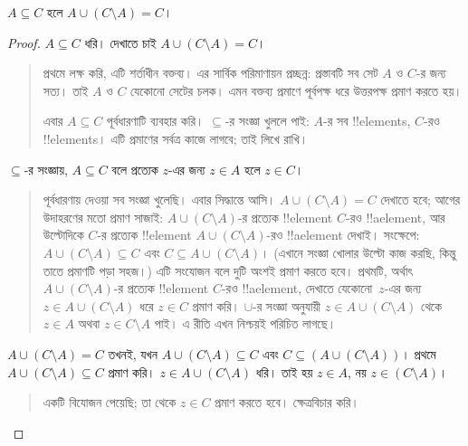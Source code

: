 \documentclass[../../../include/open-logic-section]{subfiles}
\begin{document}


\begin{prop}
$A \subseteq C$ হলে $A \cup (C \setminus A) = C$।
\end{prop}

\begin{proof}
  $A \subseteq C$ ধরি। দেখাতে চাই
  $A \cup (C \setminus A) = C$।
  \begin{quote}
    প্রথমে লক্ষ করি, এটি শর্তাধীন বক্তব্য। এর
    সার্বিক পরিমাণায়ন প্রচ্ছন্ন: প্রস্তাবটি সব সেট
    $A$ ও $C$-র জন্য সত্য। তাই $A$ ও $C$
    যেকোনো সেটের চলক। এমন বক্তব্য প্রমাণে
    পূর্বপক্ষ ধরে উত্তরপক্ষ প্রমাণ করতে হয়।

    এবার $A \subseteq C$ পূর্বধারণাটি ব্যবহার করি।
    $\subseteq$-র সংজ্ঞা খুললে পাই: $A$-র সব
    !!{element}s, $C$-রও !!{element}s।
    এটি প্রমাণের সর্বত্র কাজে লাগবে; তাই লিখে রাখি।
  \end{quote}
  $\subseteq$-র সংজ্ঞায়, $A \subseteq C$ বলে
  প্রত্যেক $z$-এর জন্য $z \in A$ হলে $z \in C$।
  \begin{quote}
    পূর্বধারণায় দেওয়া সব সংজ্ঞা খুলেছি। এবার
    সিদ্ধান্তে আসি। $A \cup (C \setminus A) = C$
    দেখাতে হবে; আগের উদাহরণের মতো প্রমাণ
    সাজাই: $A \cup (C \setminus A)$-র প্রত্যেক
    !!{element} $C$-রও !!a{element}, আর
    উল্টোদিকে $C$-র প্রত্যেক !!{element}
    $A \cup (C \setminus A)$-রও !!a{element}
    দেখাই। সংক্ষেপে: $A \cup (C \setminus A)
    \subseteq C$ এবং $C \subseteq A \cup (C
    \setminus A)$। (এখানে সংজ্ঞা খোলার উল্টো
    কাজ করছি, কিন্তু তাতে প্রমাণটি পড়া সহজ।)
    এটি সংযোজন বলে দুটি অংশই প্রমাণ করতে হবে।
    প্রথমটি, অর্থাৎ $A \cup (C \setminus A)$-র
    প্রত্যেক !!{element} $C$-রও !!a{element},
    দেখাতে যেকোনো~$z$-এর জন্য
    $z \in A \cup (C \setminus A)$ ধরে
    $z \in C$ প্রমাণ করি। $\cup$-র সংজ্ঞা অনুযায়ী
    $z \in A \cup (C \setminus A)$ থেকে
    $z \in A$ অথবা $z \in C \setminus A$ পাই।
    এ রীতি এখন নিশ্চয়ই পরিচিত লাগছে।
  \end{quote}
  $A \cup (C \setminus A) = C$ তখনই, যখন
  $A \cup (C \setminus A) \subseteq C$ এবং
  $C \subseteq (A \cup (C \setminus A))$। প্রথমে
  $A \cup (C \setminus A) \subseteq C$ প্রমাণ করি।
  $z \in A \cup (C \setminus A)$ ধরি। তাই হয়
  $z \in A$, নয় $z \in (C \setminus A)$।
  \begin{quote}
    একটি বিযোজন পেয়েছি; তা থেকে $z \in C$
    প্রমাণ করতে হবে। ক্ষেত্রবিচার করি।
  \end{quote}

\end{proof}
\end{document}
